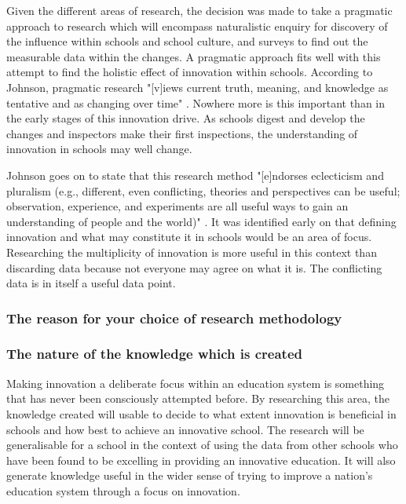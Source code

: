 Given the different areas of research, the decision was made to take a pragmatic approach to research which will encompass naturalistic enquiry for discovery of the influence within schools and school culture, and surveys to find out the measurable data within the changes.  A pragmatic approach fits well with this attempt to find the holistic effect of innovation within schools. According to Johnson, pragmatic research "[v]iews current truth, meaning, and knowledge as tentative and as changing over time" \cite[p. 18]{Johnson_2004}. Nowhere more is this important than in the early stages of this innovation drive. As schools digest and develop the changes and inspectors make their first inspections, the understanding of innovation in schools may well change.

Johnson goes on to state that this research method "[e]ndorses eclecticism and pluralism (e.g., different, even conflicting, theories and perspectives can be useful; observation, experience, and experiments are all useful ways to gain an understanding of people and the world)" \cite[p. 18]{Johnson_2004}. It was identified early on that defining innovation and what may constitute it in schools would be an area of focus. Researching the multiplicity of innovation is more useful in this context than discarding data because not everyone may agree on what it is. The conflicting data is in itself a useful data point.


\subsubsection{The reason for your choice of research methodology}

\subsubsection{The nature of the knowledge which is created}
Making innovation a deliberate focus within an education system is something that has never been consciously attempted before. By researching this area, the knowledge created will usable to decide to what extent innovation is beneficial in schools and how best to achieve an innovative school. The research will be generalisable for a school in the context of using the data from other schools who have been found to be excelling in providing an innovative education. It will also generate knowledge useful in the wider sense of trying to improve a nation's education system through a focus on innovation. 


